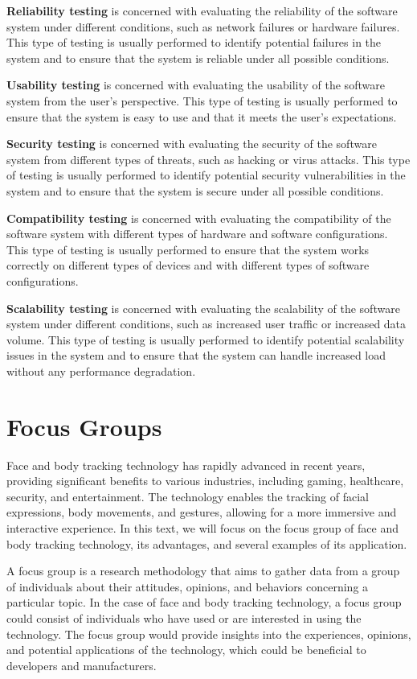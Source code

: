 \textbf{Reliability testing} is concerned with evaluating the reliability of the software system under different conditions, 
such as network failures or hardware failures. This type of testing is usually performed to identify potential failures 
in the system and to ensure that the system is reliable under all possible conditions.

\textbf{Usability testing} is concerned with evaluating the usability of the software system from the user's perspective. This 
type of testing is usually performed to ensure that the system is easy to use and that it meets the user's expectations.

\textbf{Security testing} is concerned with evaluating the security of the software system from different types of threats, such as 
hacking or virus attacks. This type of testing is usually performed to identify potential security vulnerabilities in the 
system and to ensure that the system is secure under all possible conditions.

\textbf{Compatibility testing} is concerned with evaluating the compatibility of the software system with different types of hardware 
and software configurations. This type of testing is usually performed to ensure that the system works correctly on different 
types of devices and with different types of software configurations.

\textbf{Scalability testing} is concerned with evaluating the scalability of the software system under different conditions, such as 
increased user traffic or increased data volume. This type of testing is usually performed to identify potential scalability 
issues in the system and to ensure that the system can handle increased load without any performance degradation.

\section{Focus Groups}
Face and body tracking technology has rapidly advanced in recent years, providing significant benefits to various industries, 
including gaming, healthcare, security, and entertainment. The technology enables the tracking of facial expressions, body movements, 
and gestures, allowing for a more immersive and interactive experience. In this text, we will focus on the focus group of face and body 
tracking technology, its advantages, and several examples of its application.

A focus group is a research methodology that aims to gather data from a group of individuals about their attitudes, opinions, 
and behaviors concerning a particular topic. In the case of face and body tracking technology, a focus group could consist of 
individuals who have used or are interested in using the technology. The focus group would provide insights into the experiences, 
opinions, and potential applications of the technology, which could be beneficial to developers and manufacturers.

